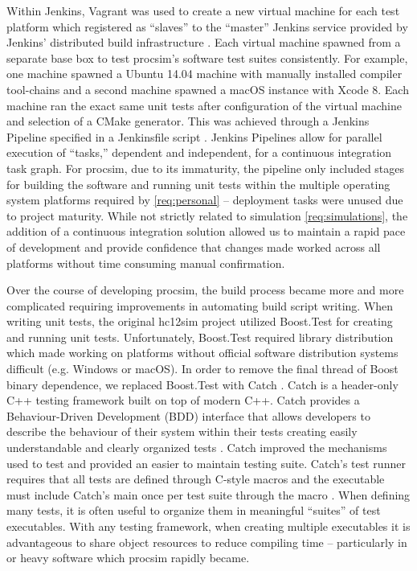 Within Jenkins, Vagrant was used to create a new virtual machine for each test platform which registered as ``slaves'' to the ``master'' Jenkins service provided by Jenkins' distributed build infrastructure \cite{Jenkins:DistributedBuilds}. Each virtual machine spawned from a separate base box to test procsim's software test suites consistently. For example, one machine spawned a Ubuntu 14.04 machine with manually installed compiler tool-chains and a second machine spawned a macOS instance with Xcode 8. Each machine ran the exact same unit tests after configuration of the virtual machine and selection of a CMake generator. This was achieved through a Jenkins Pipeline \cite{Jenkins:Pipeline} specified in a Jenkinsfile script \cite{Jenkins:Pipeline:Jenkinsfile}. Jenkins Pipelines allow for parallel execution of ``tasks,'' dependent and independent, for a continuous integration task graph. For procsim, due to its immaturity, the pipeline only included stages for building the software and running unit tests within the multiple operating system platforms required by \cref{req:personal} -- deployment tasks were unused due to project maturity. While not strictly related to simulation \cref{req:simulations}, the addition of a continuous integration solution allowed us to maintain a rapid pace of development and provide confidence that changes made worked across all platforms without time consuming manual confirmation.

Over the course of developing procsim, the build process became more and more complicated requiring improvements in automating build script writing. When writing unit tests, the original hc12sim project utilized Boost.Test \cite{Boost1.53.0:Test} for creating and running unit tests. Unfortunately, Boost.Test required library distribution which made working on platforms without official software distribution systems difficult (e.g. Windows or macOS). In order to remove the final thread of Boost binary dependence, we replaced Boost.Test with Catch \cite{CatchLib}. Catch is a header-only C++ testing framework built on top of modern C++. Catch provides a Behaviour-Driven Development (BDD) interface that allows developers to describe the behaviour of their system within their tests creating easily understandable and clearly organized tests \cite{Solis2011}. Catch improved the mechanisms used to test and provided an easier to maintain testing suite. Catch's test runner requires that all tests are defined through C-style macros and the executable must include Catch's main once per test suite through the  macro \cite{CatchLib:Tutorial}. When defining many tests, it is often useful to organize them in meaningful ``suites'' of test executables. With any testing framework, when creating multiple executables it is advantageous to share object resources to reduce compiling time -- particularly in  or  heavy software which procsim rapidly became.


